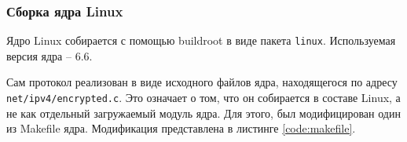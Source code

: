 \subsubsection{Сборка ядра Linux}

Ядро Linux собирается с помощью buildroot в виде пакета \texttt{linux}. Используемая версия ядра -- 6.6.

Сам протокол реализован в виде исходного файлов ядра, находящегося по адресу \texttt{net/ipv4/encrypted.c}. Это означает о том, что он собирается в составе Linux, а не как отдельный загружаемый модуль ядра. Для этого, был модифицирован один из Makefile ядра. Модификация представлена в листинге \ref{code:makefile}.


\pagebreak
